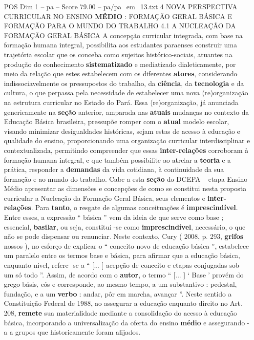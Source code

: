 \begin{textsample}{POS Dim 1 – pa – Score 79.00 – pa/pa\_em\_13.txt}  \label{ex:f1_pos_033}
4 NOVA PERSPECTIVA CURRICULAR NO ENSINO \textbf{MÉDIO} : FORMAÇÃO GERAL BÁSICA E FORMAÇÃO PARA O MUNDO DO TRABALHO 4.1 A NUCLEAÇÃO DA FORMAÇÃO GERAL BÁSICA A concepção curricular integrada, com base na formação humana integral, possibilita aos estudantes paraenses construir uma trajetória escolar que os conceba como sujeitos histórico-sociais, atuantes na produção do conhecimento \textbf{sistematizado} e mediatizado dialeticamente, por meio da relação que estes estabelecem com os diferentes \textbf{atores}, considerando indissociavelmente os pressupostos do trabalho, da \textbf{ciência}, da \textbf{tecnologia} e da cultura, o que perpassa pela necessidade de estabelecer uma nova (re)organização na estrutura curricular no Estado do Pará.
Essa (re)organização, já anunciada genericamente na \textbf{seção} anterior, amparada nas \textbf{atuais} mudanças no contexto da Educação Básica brasileira, pressupõe romper com o \textbf{atual} modelo escolar, visando minimizar desigualdades históricas, sejam estas de acesso à educação e qualidade do ensino, proporcionando uma organização curricular interdisciplinar e contextualizada, permitindo compreender que essas \textbf{inter-relações} corroboram à formação humana integral, e que também possibilite ao atrelar a \textbf{teoria} e a prática, responder a \textbf{demandas} da vida cotidiana, à continuidade da sua formação e ao mundo do trabalho.
Cabe a esta \textbf{seção} do DCEPA – etapa Ensino Médio apresentar as dimensões e concepções de como se constitui nesta proposta curricular a Nucleação da Formação Geral Básica, seus elementos e \textbf{inter-relações}.
Para \textbf{tanto}, o resgate de algumas conceituações é \textbf{imprescindível}.
Entre esses, a expressão “ básica ” vem da ideia de que serve como base ; essencial, \textbf{basilar}, ou seja, constitui -se como \textbf{imprescindível}, necessário, o que não se pode dispensar ou renunciar.
Neste contexto, Cury ( 2008, p. 293, \textbf{grifos} nossos ), no esforço de explicar o “ conceito novo de educação básica ”, estabelece um paralelo entre os termos base e básica, para afirmar que a educação básica, enquanto nível, refere -se a “ [... ] acepção de conceito e etapas conjugadas sob um só todo ”.
Assim, de acordo com o \textbf{autor}, o termo “ [... ] ‘ Base ’ provém do grego básis, eós e corresponde, ao mesmo tempo, a um substantivo : pedestal, fundação, e a um \textbf{verbo} : andar, pôr em marcha, avançar ”.
Neste sentido a Constituição Federal de 1988, ao assegurar a educação enquanto direito no Art. 208, \textbf{remete} sua materialidade mediante a consolidação do acesso à educação básica, incorporando a universalização da oferta do ensino \textbf{médio} e assegurando -a a grupos que historicamente foram alijados.

\end{textsample}
